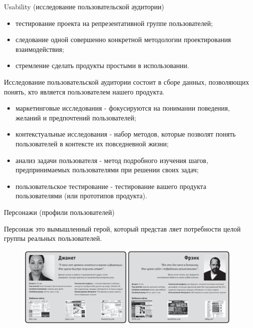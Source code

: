 \documentclass{beamer}
\begin{document}
\begin{frame}
\begin{block}{Usability (исследование пользовательской аудитории)}
\begin{itemize}
\item тестирование проекта на репрезентативной группе пользователей;
\item следование одной совершенно конкретной методологии проектирования взаимодействия;
\item стремление сделать продукты простыми в использовании.
\end{itemize}
\end{block}
Исследование пользовательской аудитории состоит в сборе данных, позволяющих понять, кто является пользователем нашего продукта.
\begin{itemize}
\item маркетинговые исследования - фокусируются на понимании поведения, желаний и предпочтений пользователей;
\item контекстуальные исследования -  набор методов, которые позволят понять пользователей в контексте их повседневной жизни;
\item анализ задачи пользователя - метод подробного изучения шагов, предпринимаемых пользователями при решении своих задач;
\item пользовательское тестирование - тестирование вашего продукта пользователями (или прототипов продукта).
\end{itemize}
\end{frame}

\begin{frame}{Персонажи (профили пользователей)}
\begin{block}{Персонаж}
это вымышленный герой, который представ ляет потребности целой группы реальных пользователей.
\end{block}
\begin{figure}[h]
\centering
\includegraphics[scale=0.35]{images/lec01-pic16.png}
\end{figure}
\end{frame}
\end{document}
